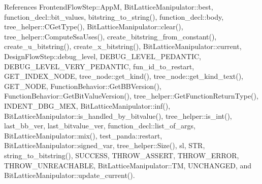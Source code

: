 References Frontend\+Flow\+Step\+::\+AppM, Bit\+Lattice\+Manipulator\+::best, function\+\_\+decl\+::bit\+\_\+values, bitstring\+\_\+to\+\_\+string(), function\+\_\+decl\+::body, tree\+\_\+helper\+::\+C\+Get\+Type(), Bit\+Lattice\+Manipulator\+::clear(), tree\+\_\+helper\+::\+Compute\+Ssa\+Uses(), create\+\_\+bitstring\+\_\+from\+\_\+constant(), create\+\_\+u\+\_\+bitstring(), create\+\_\+x\+\_\+bitstring(), Bit\+Lattice\+Manipulator\+::current, Design\+Flow\+Step\+::debug\+\_\+level, D\+E\+B\+U\+G\+\_\+\+L\+E\+V\+E\+L\+\_\+\+P\+E\+D\+A\+N\+T\+IC, D\+E\+B\+U\+G\+\_\+\+L\+E\+V\+E\+L\+\_\+\+V\+E\+R\+Y\+\_\+\+P\+E\+D\+A\+N\+T\+IC, fun\+\_\+id\+\_\+to\+\_\+restart, G\+E\+T\+\_\+\+I\+N\+D\+E\+X\+\_\+\+N\+O\+DE, tree\+\_\+node\+::get\+\_\+kind(), tree\+\_\+node\+::get\+\_\+kind\+\_\+text(), G\+E\+T\+\_\+\+N\+O\+DE, Function\+Behavior\+::\+Get\+B\+B\+Version(), Function\+Behavior\+::\+Get\+Bit\+Value\+Version(), tree\+\_\+helper\+::\+Get\+Function\+Return\+Type(), I\+N\+D\+E\+N\+T\+\_\+\+D\+B\+G\+\_\+\+M\+EX, Bit\+Lattice\+Manipulator\+::inf(), Bit\+Lattice\+Manipulator\+::is\+\_\+handled\+\_\+by\+\_\+bitvalue(), tree\+\_\+helper\+::is\+\_\+int(), last\+\_\+bb\+\_\+ver, last\+\_\+bitvalue\+\_\+ver, function\+\_\+decl\+::list\+\_\+of\+\_\+args, Bit\+Lattice\+Manipulator\+::mix(), test\+\_\+panda\+::restart, Bit\+Lattice\+Manipulator\+::signed\+\_\+var, tree\+\_\+helper\+::\+Size(), sl, S\+TR, string\+\_\+to\+\_\+bitstring(), S\+U\+C\+C\+E\+SS, T\+H\+R\+O\+W\+\_\+\+A\+S\+S\+E\+RT, T\+H\+R\+O\+W\+\_\+\+E\+R\+R\+OR, T\+H\+R\+O\+W\+\_\+\+U\+N\+R\+E\+A\+C\+H\+A\+B\+LE, Bit\+Lattice\+Manipulator\+::\+TM, U\+N\+C\+H\+A\+N\+G\+ED, and Bit\+Lattice\+Manipulator\+::update\+\_\+current().


